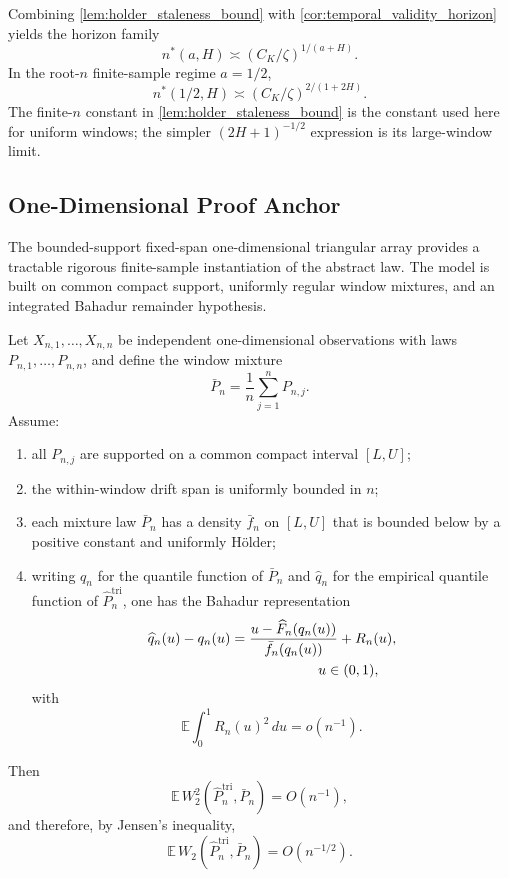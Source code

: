 Combining \cref{lem:holder_staleness_bound} with
\cref{cor:temporal_validity_horizon} yields the horizon family
\[
  n^*(a,H) \asymp (C_K/\zeta)^{1/(a+H)}.
\]
In the root-$n$ finite-sample regime $a=1/2$,
\[
  n^*(1/2,H) \asymp (C_K/\zeta)^{2/(1+2H)}.
\]
The finite-$n$ constant in
\cref{lem:holder_staleness_bound} is the constant used here for
uniform windows; the simpler $(2H+1)^{-1/2}$ expression is its large-window
limit.

\subsection{One-Dimensional Proof Anchor}
\label{subsec:one_dimensional_proof_model}

The bounded-support fixed-span one-dimensional triangular array provides a
tractable rigorous finite-sample instantiation of the abstract law. The model is
built on common compact support, uniformly regular window mixtures, and an
integrated Bahadur remainder hypothesis.

\begin{proposition}\label{prop:one_dimensional_root_n_bound}
Let $X_{n,1},\dots,X_{n,n}$ be independent one-dimensional observations with laws
$P_{n,1},\dots,P_{n,n}$, and define the window mixture
\[
  \bar P_n = \frac{1}{n}\sum_{j=1}^n P_{n,j}.
\]
Assume:
\begin{enumerate}[label=(\roman*)]
  \item all $P_{n,j}$ are supported on a common compact interval $[L,U]$;
  \item the within-window drift span is uniformly bounded in $n$;
  \item each mixture law $\bar P_n$ has a density $\bar f_n$ on $[L,U]$ that is
  bounded below by a positive constant and uniformly Hölder;
  \item writing $q_n$ for the quantile function of $\bar P_n$ and $\widehat q_n$
  for the empirical quantile function of $\widehat P_n^{\mathrm{tri}}$, one has
  the Bahadur representation
  \[
    \begin{aligned}
    \widehat q_n(u)-q_n(u)
    &= \frac{u-\widehat F_n(q_n(u))}{\bar f_n(q_n(u))} + R_n(u), \\
    &\hspace{2.2cm} u\in(0,1),
    \end{aligned}
  \]
  with
  \[
    \mathbb E\int_0^1 R_n(u)^2\,du=o(n^{-1}).
  \]
\end{enumerate}
Then
\[
  \mathbb E\,W_2^2\!\left(\widehat P_n^{\mathrm{tri}},\bar P_n\right)=O(n^{-1}),
\]
and therefore, by Jensen's inequality,
\[
  \mathbb E\,W_2\!\left(\widehat P_n^{\mathrm{tri}},\bar P_n\right)=O(n^{-1/2}).
\]
\end{proposition}

